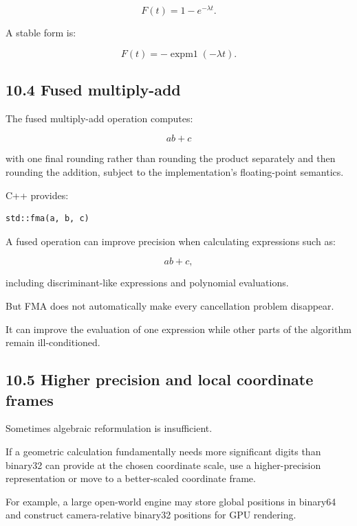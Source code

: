 \[ F(t)=1-e^{-\lambda t}. \]

A stable form is:

\[ \boxed{ F(t)=-\operatorname{expm1}(-\lambda t) }. \]

\subsection{10.4 Fused multiply-add}\label{02-foundations-ii-ch028-fused-multiply-add}

\hypertarget{02-foundations-ii-ch028-fused-multiply-add}{}

The fused multiply-add operation computes:

\[ ab+c \]

with one final rounding rather than rounding the product separately and then rounding the addition, subject to the implementation's floating-point semantics.

C++ provides:

\begin{verbatim}
std::fma(a, b, c)
\end{verbatim}

A fused operation can improve precision when calculating expressions such as:

\[ ab+c, \]

including discriminant-like expressions and polynomial evaluations.

But FMA does not automatically make every cancellation problem disappear.

It can improve the evaluation of one expression while other parts of the algorithm remain ill-conditioned.

\subsection{10.5 Higher precision and local coordinate frames}\label{02-foundations-ii-ch028-higher-precision-and-local-coordinate-frames}

\hypertarget{02-foundations-ii-ch028-higher-precision-and-local-coordinate-frames}{}

Sometimes algebraic reformulation is insufficient.

If a geometric calculation fundamentally needs more significant digits than binary32 can provide at the chosen coordinate scale, use a higher-precision representation or move to a better-scaled coordinate frame.

For example, a large open-world engine may store global positions in binary64 and construct camera-relative binary32 positions for GPU rendering.

